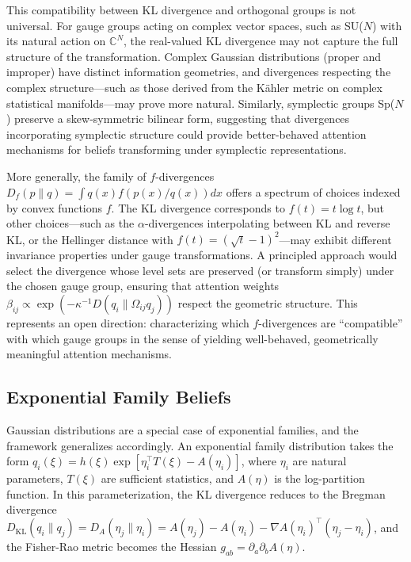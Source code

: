 \documentclass[twoside,11pt]{article}
\begin{document}
This compatibility between KL divergence and orthogonal groups is not universal. For gauge groups acting on complex vector spaces, such as SU($N$) with its natural action on $\mathbb{C}^N$, the real-valued KL divergence may not capture the full structure of the transformation. Complex Gaussian distributions (proper and improper) have distinct information geometries, and divergences respecting the complex structure---such as those derived from the Kähler metric on complex statistical manifolds---may prove more natural. Similarly, symplectic groups Sp($N$) preserve a skew-symmetric bilinear form, suggesting that divergences incorporating symplectic structure could provide better-behaved attention mechanisms for beliefs transforming under symplectic representations.

More generally, the family of $f$-divergences $D_f(p \| q) = \int q(x) f(p(x)/q(x)) dx$ offers a spectrum of choices indexed by convex functions $f$. The KL divergence corresponds to $f(t) = t \log t$, but other choices---such as the $\alpha$-divergences interpolating between KL and reverse KL, or the Hellinger distance with $f(t) = (\sqrt{t} - 1)^2$---may exhibit different invariance properties under gauge transformations. A principled approach would select the divergence whose level sets are preserved (or transform simply) under the chosen gauge group, ensuring that attention weights $\beta_{ij} \propto \exp(-\kappa^{-1} D(q_i \| \Omega_{ij} q_j))$ respect the geometric structure. This represents an open direction: characterizing which $f$-divergences are ``compatible'' with which gauge groups in the sense of yielding well-behaved, geometrically meaningful attention mechanisms.

\subsection{Exponential Family Beliefs}

Gaussian distributions are a special case of exponential families, and the framework generalizes accordingly. An exponential family distribution takes the form $q_i(\xi) = h(\xi) \exp[\eta_i^\top T(\xi) - A(\eta_i)]$, where $\eta_i$ are natural parameters, $T(\xi)$ are sufficient statistics, and $A(\eta)$ is the log-partition function. In this parameterization, the KL divergence reduces to the Bregman divergence $D_{\mathrm{KL}}(q_i \| q_j) = D_A(\eta_j \| \eta_i) = A(\eta_j) - A(\eta_i) - \nabla A(\eta_i)^\top(\eta_j - \eta_i)$, and the Fisher-Rao metric becomes the Hessian $g_{ab} = \partial_a \partial_b A(\eta)$.
\end{document}
